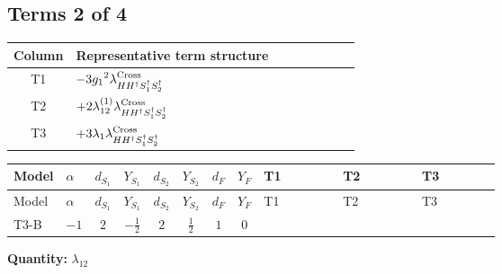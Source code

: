 \documentclass[8pt]{article}
\begin{document}
\begin{landscape}
\subsection*{Terms 2 of 4}
\begin{center}
\begin{tabular}{@{}c >{\raggedright\arraybackslash}p{0.82\linewidth}@{}}
\toprule
Column & Representative term structure \\
\midrule
T1 & \(\displaystyle -3 {g_1}^2 {\lambda_{H H^\dagger S_1^\dagger S_2^\dagger}^{\rm Cross}}\) \\
\midrule
T2 & \(\displaystyle +2 {\lambda_{12}^{(1)}} {\lambda_{H H^\dagger S_1^\dagger S_2^\dagger}^{\rm Cross}}\) \\
\midrule
T3 & \(\displaystyle +3 {\lambda_1} {\lambda_{H H^\dagger S_1^\dagger S_2^\dagger}^{\rm Cross}}\) \\
\midrule
\bottomrule
\end{tabular}
\end{center}
\smallskip
\tiny
\begin{longtable}{@{}llcccccc >{\raggedright\arraybackslash}p{0.21\linewidth} >{\raggedright\arraybackslash}p{0.21\linewidth} >{\raggedright\arraybackslash}p{0.21\linewidth}@{}}
\toprule
Model & $\alpha$ & $d_{S_1}$ & $Y_{S_1}$ & $d_{S_2}$ & $Y_{S_2}$ & $d_F$ & $Y_F$ & T1 & T2 & T3 \\
\midrule
\endfirsthead
\toprule
Model & $\alpha$ & $d_{S_1}$ & $Y_{S_1}$ & $d_{S_2}$ & $Y_{S_2}$ & $d_F$ & $Y_F$ & T1 & T2 & T3 \\
\midrule
\endhead
T3-B & $-1$ & $2$ & $-\frac{1}{2}$ & $2$ & $\frac{1}{2}$ & $1$ & $0$ & \scriptsize\adjustbox{max width=\linewidth}{$\begin{gathered} -3 {g_1}^2 {\lambda_{H H^\dagger S_1^\dagger S_2^\dagger}^{\rm Cross}}\end{gathered}$} & \scriptsize\adjustbox{max width=\linewidth}{$\begin{gathered} +2 {\lambda_{12}^{(1)}} {\lambda_{H H^\dagger S_1^\dagger S_2^\dagger}^{\rm Cross}}\end{gathered}$} & \scriptsize\adjustbox{max width=\linewidth}{$\begin{gathered} +3 {\lambda_1} {\lambda_{H H^\dagger S_1^\dagger S_2^\dagger}^{\rm Cross}}\end{gathered}$} \\
\midrule
\bottomrule
\end{longtable}
\clearpage
\noindent\textbf{Quantity: }$\lambda_{12}$\par\smallskip

\end{landscape}
\end{document}
